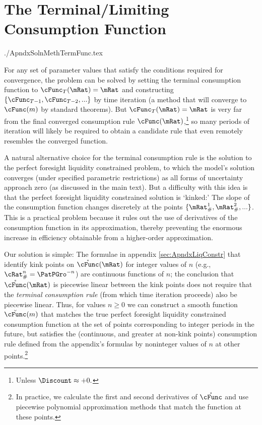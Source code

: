 \documentclass{econtex}
\begin{document}
\large

\large{}

\section{The Terminal/Limiting Consumption Function}
\begin{verbatimwrite}{./ApndxSolnMethTermFunc.tex}

  For any set of parameter values that satisfy the conditions required
  for convergence, the problem can be solved by setting the terminal
  consumption function to $\cFunc_{T}(\mRat) = \mRat$ and constructing
  $\{\cFunc_{T-1}, \cFunc_{T-2}, ... \}$ by time iteration (a method
  that will converge to $\cFunc(m)$ by standard theorems).  But $\cFunc_{T}(\mRat)=\mRat$ is very far from
  the final converged consumption rule $\cFunc(\mRat)$,\footnote{Unless $\Discount \approx +0.$} so many
  periods of iteration will likely be required to obtain a candidate rule
  that even remotely resembles the converged function.

  A natural alternative choice for the terminal consumption rule is
  the solution to the perfect foresight liquidity constrained problem,
  to which the model's solution converges (under specified parametric
  restrictions) as all forms of uncertainty approach zero (as
  discussed in the main text).  But a difficulty with this idea is
  that the perfect foresight liquidity constrained solution is
  `kinked:' The slope of the consumption function changes discretely
  at the points $\{\mRat^{1}_{\#},\mRat^{2}_{\#},...\}$.  This is a
  practical problem because it rules out the use of derivatives of the
  consumption function in its approximation, thereby preventing the
  enormous increase in efficiency obtainable from a higher-order
  approximation.

Our solution is simple: The formulae in appendix
\ref{sec:ApndxLiqConstr} that identify kink points on
$\mathring{\cFunc}(\mRat)$ for integer values of $n$ (e.g.,
$\cRat_{\#}^{n} = \PatPGro^{-n}$) are continuous functions of $n$; the
conclusion that $\mathring{\cFunc}(\mRat)$ is piecewise linear
between the kink points does not require that the {\it terminal
  consumption rule} (from which time iteration proceeds) also be
piecewise linear.  Thus, for values $n \geq 0$ we can construct a
smooth function $\breve{\cFunc}(m)$ that matches the true perfect foresight
liquidity constrained consumption function at the set of points
corresponding to integer periods in the future, but satisfies the
(continuous, and greater at non-kink points) consumption rule defined from the
appendix's formulas by noninteger values of $n$ at other
points.\footnote{In practice, we calculate the first and second
  derivatives of $\mathring{\cFunc}$ and use piecewise polynomial
  approximation methods that match the function at these points.}



\end{verbatimwrite}
\end{document}
